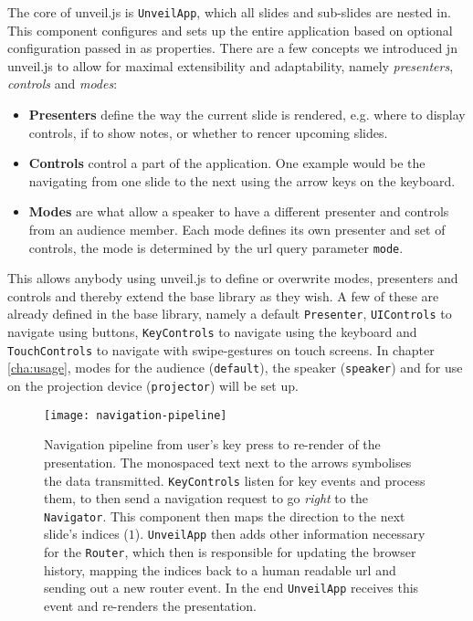 The core of unveil.js is \texttt{UnveilApp}, which all slides and sub-slides are nested in. This component configures and sets up the entire application based on optional configuration passed in as properties. There are a few concepts we introduced jn unveil.js to allow for maximal extensibility and adaptability, namely \emph{presenters}, \emph{controls} and \emph{modes}:
%
\begin{itemize}
\item \textbf{Presenters} define the way the current slide is rendered, e.g. where to display controls, if to show notes, or whether to rencer upcoming slides.
\item \textbf{Controls} control a part of the application. One example would be the navigating from one slide to the next using the arrow keys on the keyboard.
\item \textbf{Modes} are what allow a speaker to have a different presenter and controls from an audience member. Each mode defines its own presenter and set of controls, the mode is determined by the url query parameter \texttt{mode}.
\end{itemize}
This allows anybody using unveil.js to define or overwrite modes, presenters and controls and thereby extend the base library as they wish. A few of these are already defined in the base library, namely a default \texttt{Presenter}, \texttt{UIControls} to navigate using buttons, \texttt{KeyControls} to navigate using the keyboard and \texttt{TouchControls} to navigate with swipe-gestures on touch screens. In chapter \ref{cha:usage}, modes for the audience (\texttt{de\-fault}), the speak\-er (\texttt{speak\-er}) and for use on the projection device (\texttt{projector}) will be set up.

\begin{figure}
\centering
\texttt{[image: navigation-pipeline]}
\caption{Navigation pipeline from user's key press to re-render of the presentation. The monospaced text next to the arrows symbolises the data transmitted. \texttt{KeyControls} listen for key events and process them, to then send a navigation request to go \emph{right} to the \texttt{Navigator}. This component then maps the direction to the next slide's indices ($1$). \texttt{UnveilApp} then adds other information necessary for the \texttt{Router}, which then is responsible for updating the browser history, mapping the indices back to a human readable url and sending out a new router event. In the end \texttt{UnveilApp} receives this event and re-renders the presentation.}
\label{fig:implementation-technologies-unveil-navigation}
\end{figure}

